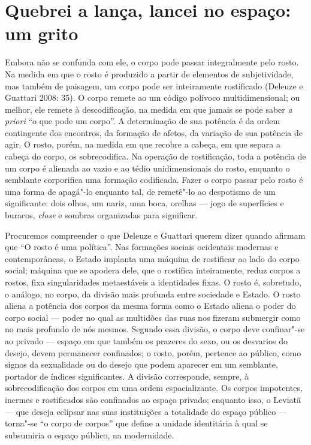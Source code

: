 \section{Quebrei a lança, lancei no espaço: um grito}

Embora não se confunda com ele, o corpo pode passar integralmente pelo
rosto. Na medida em que o rosto é produzido a partir de elementos de
subjetividade, mas também de paisagem, um corpo pode ser inteiramente
rostificado (Deleuze e Guattari 2008: 35). O corpo remete ao um código
polívoco multidimensional; ou melhor, ele remete à descodificação, na
medida em que jamais se pode saber \emph{a priori} ``o que pode um
corpo''. A determinação de sua potência é da ordem contingente dos
encontros, da formação de afetos, da variação de sua potência de agir. O
rosto, porém, na medida em que recobre a cabeça, em que separa a cabeça
do corpo, os sobrecodifica. Na operação de rostificação, toda a potência
de um corpo é alienada ao vazio e ao tédio unidimensionais do rosto,
enquanto o semblante corporifica uma formação codificada. Fazer o corpo
passar pelo rosto é uma forma de apagá"-lo enquanto tal, de remetê"-lo ao
despotismo de um significante: dois olhos, um nariz, uma boca, orelhas
--- jogo de superfícies e buracos, \emph{close} e sombras organizadas
para significar.

Procuremos compreender o que Deleuze e Guattari querem dizer quando
afirmam que ``O rosto é uma política''. Nas formações sociais ocidentais
modernas e contemporâneas, o Estado implanta uma máquina de rostificar
ao lado do corpo social; máquina que se apodera dele, que o rostifica
inteiramente, reduz corpos a rostos, fixa singularidades metaestáveis a
identidades fixas. O rosto é, sobretudo, o análogo, no corpo, da divisão
mais profunda entre sociedade e Estado. O rosto aliena a potência dos
corpos da mesma forma como o Estado aliena o poder do corpo social ---
poder no qual as multidões das ruas nos fizeram submergir como no mais
profundo de nós mesmos. Segundo essa divisão, o corpo deve confinar"-se
ao privado --- espaço em que também os prazeres do sexo, ou os desvarios
do desejo, devem permanecer confinados; o rosto, porém, pertence ao
público, como signos da sexualidade ou do desejo que podem aparecer em
um semblante, portador de índices significantes. A divisão corresponde,
sempre, à sobrecodificação dos corpos em uma ordem espacializante. Os
corpos impotentes, inermes e rostificados são confinados ao espaço
privado; enquanto isso, o Leviatã --- que deseja eclipsar nas suas
instituições a totalidade do espaço público --- torna"-se ``o corpo de
corpos'' que define a unidade identitária à qual se subsumiria o espaço
público, na modernidade.

